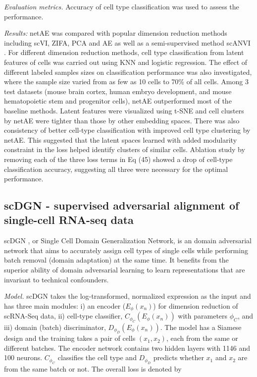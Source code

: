 \documentclass[
]{book}
\begin{document}
\emph{Evaluation metrics.} Accuracy of cell type classification was used to assess the performance.

\emph{Results:} netAE was compared with popular dimension reduction methods including scVI, ZIFA, PCA and AE as well as a semi-supervised method scANVI \citep{RN169}. For different dimension reduction methods, cell type classification from latent features of cells was carried out using KNN and logistic regression. The effect of different labeled samples sizes on classification performance was also investigated, where the sample size varied from as few as 10 cells to 70\% of all cells. Among 3 test datasets (mouse brain cortex, human embryo development, and mouse hematopoietic stem and progenitor cells), netAE outperformed most of the baseline methods. Latent features were visualized using t-SNE and cell clusters by netAE were tighter than those by other embedding spaces. There was also consistency of better cell-type classification with improved cell type clustering by netAE. This suggested that the latent spaces learned with added modularity constraint in the loss helped identify clusters of similar cells. Ablation study by removing each of the three loss terms in Eq (45) showed a drop of cell-type classification accuracy, suggesting all three were necessary for the optimal performance.

\hypertarget{ch-5-6-4}{%
\subsection{scDGN - supervised adversarial alignment of single-cell RNA-seq data}\label{ch-5-6-4}}

scDGN \citep{RN172}, or Single Cell Domain Generalization Network, is an domain adversarial network that aims to accurately assign cell types of single cells while performing batch removal (domain adaptation) at the same time. It benefits from the superior ability of domain adversarial learning to learn representations that are invariant to technical confounders.

\emph{Model.} scDGN takes the log-transformed, normalized expression as the input and has three main modules: i) an encoder (\(E_{\phi}(x_{n})\)) for dimension reduction of scRNA-Seq data, ii) cell-type classifier, \(C_{\phi_{C}}(E_{\phi}(x_{n}))\) with parameters \(\phi_{C}\), and iii) domain (batch) discriminator, \(D_{ϕ_{D}} (E_{\phi}(x_{n}))\). The model has a Siamese design and the training takes a pair of cells \((x_{1},x_{2})\), each from the same or different batches. The encoder network contains two hidden layers with 1146 and 100 neurons. \(C_{\phi_{C}}\) classifies the cell type and \(D_{\phi_{D}}\) predicts whether \(x_{1}\) and \(x_{2}\) are from the same batch or not. The overall loss is denoted by
\end{document}
